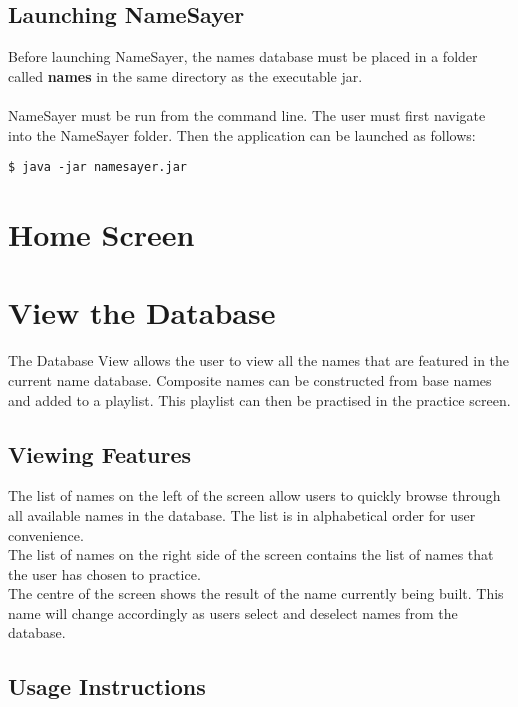 \documentclass{article}
\begin{document}
\subsection{Launching NameSayer}
Before launching NameSayer, the names database must be placed in a folder called
\textbf{names} in the same directory as  the executable jar. \\

 \ \\

NameSayer must be run from the command line. The user must first navigate into
the NameSayer folder. Then the application can be launched as follows:

\begin{verbatim}
$ java -jar namesayer.jar
\end{verbatim}

\section{Home Screen}

\section{View the Database}
The Database View allows the user to view all the names that are  featured in
the current name database. Composite names can be constructed from base names
and added to a playlist. This playlist can then be practised in the practice
screen.

\subsection{Viewing Features}
The list of names on the left of the screen allow users to quickly browse
through all available names in the database. The list is in alphabetical order
for user convenience. \\

The list of names on the right side of the screen contains the list of names
that the user has chosen to practice. \\

The centre of the screen shows the result of the name currently being built.
This name will change accordingly as users select and  deselect names from the
database.

\subsection{Usage Instructions}
\end{document}
